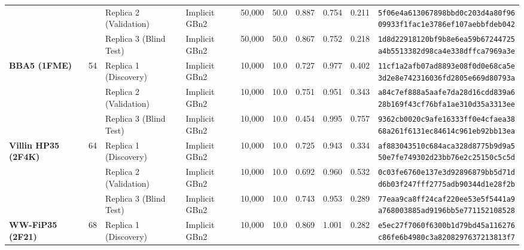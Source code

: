 \documentclass[10pt,letterpaper]{article}
\begin{document}
{\begin{longtable}{@{}l c l l r r c c c l@{}}
 &  & Replica 2 (Validation) & Implicit GBn2 & 50,000 & 50.0 & 0.887 & 0.754 & 0.211 & \shortstack[l]{\texttt{5f06e4a613067898bbd0c203d4a80f96}\\\texttt{09933f1fac1e3786ef107aebbfdeb042}} \\

 &  & Replica 3 (Blind Test) & Implicit GBn2 & 50,000 & 50.0 & 0.867 & 0.752 & 0.218 & \shortstack[l]{\texttt{1d8d22918120bf9b8e6ea59b67244725}\\\texttt{a4b5513382d98ca4e338dffca7969a3e}} \\
\midrule[0.35pt]
\textbf{BBA5 (1FME)} & 54 & Replica 1 (Discovery) & Implicit GBn2 & 10,000 & 10.0 & 0.727 & 0.977 & 0.402 & \shortstack[l]{\texttt{11cf1a2afb07ad8893e08f0d0e68ca5e}\\\texttt{3d2e8e742316036fd2805e669d80793a}} \\

 &  & Replica 2 (Validation) & Implicit GBn2 & 10,000 & 10.0 & 0.751 & 0.951 & 0.343 & \shortstack[l]{\texttt{a84c7ef888a5aafe7da28d16cdd839a6}\\\texttt{28b169f43cf76bfa1ae310d35a3313ee}} \\

 &  & Replica 3 (Blind Test) & Implicit GBn2 & 10,000 & 10.0 & 0.454 & 0.995 & 0.757 & \shortstack[l]{\texttt{9362cb0020c9afe16333ff0e4cfaea38}\\\texttt{68a261f6131ec84614c961eb92bb13ea}} \\
\midrule[0.35pt]
\textbf{Villin HP35 (2F4K)} & 64 & Replica 1 (Discovery) & Implicit GBn2 & 10,000 & 10.0 & 0.725 & 0.943 & 0.334 & \shortstack[l]{\texttt{af883043510c684aca328d8775b9d9a5}\\\texttt{50e7fe749302d23bb76e2c25150c5c5d}} \\

 &  & Replica 2 (Validation) & Implicit GBn2 & 10,000 & 10.0 & 0.692 & 0.960 & 0.532 & \shortstack[l]{\texttt{0c03fe6760e137e3d92896879bb5d71d}\\\texttt{d6b03f247fff2775adb90344d1e28f2b}} \\

 &  & Replica 3 (Blind Test) & Implicit GBn2 & 10,000 & 10.0 & 0.743 & 0.953 & 0.289 & \shortstack[l]{\texttt{77eaa9ca8ff24caf220ee53e5f5441a9}\\\texttt{a768003885ad9196bb5e771152108528}} \\
\midrule[0.35pt]
\textbf{WW-FiP35 (2F21)} & 68 & Replica 1 (Discovery) & Implicit GBn2 & 10,000 & 10.0 & 0.869 & 1.001 & 0.282 & \shortstack[l]{\texttt{e5ec27f7060f6300b1d79bd45a116276}\\\texttt{c86fe6b4980c3a8208297637213813f7}} \\


\end{longtable}}
\end{document}
